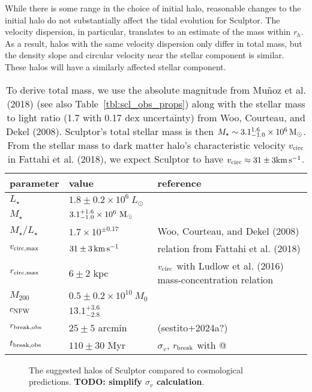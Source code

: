 While there is some range in the choice of initial halo, reasonable
changes to the initial halo do not substantially affect the tidal
evolution for Sculptor. The velocity dispersion, in particular,
translates to an estimate of the mass within \(r_h\). As a result, halos
with the same velocity dispersion only differ in total mass, but the
density slope and circular velocity near the stellar component is
similar. These halos will have a similarly affected stellar component.

\begin{table*}[t]
\centering
\caption[Derived Properties of Sculptor]{To derive total mass, we use the absolute magnitude from Muñoz et al. (2018) (see also Table \ref{tbl:scl_obs_props}) along with the stellar mass to light ratio (1.7 with 0.17 dex uncertainty) from Woo, Courteau, and Dekel (2008). Sculptor’s total stellar mass is then $M_\star \sim 3.1_{-1.0}^{1.6} \times 10^6\,{\rm M}_{\odot}$. From the stellar mass to dark matter halo’s characteristic velocity $v_{\rm circ}$ in Fattahi et al. (2018), we expect Sculptor to have $v_{\rm circ} \approx 31 \pm 3 {\rm km\,s^{-1}}$. }
\label{tbl:scl_derived_props}
\begin{tabular}{lll}
\toprule
parameter & value & reference\\
\midrule
$L_\star$ & $1.8\pm0.2\times10^6\ L_\odot$ & \\
$M_\star$ & $3.1_{-1.0}^{+1.6} \times10^6\ {\rm M}_\odot$ & \\
$M_\star / L_\star$ & $1.7\times 10^{\pm 0.17}$ & Woo, Courteau, and Dekel (2008)\\
$v_{\rm circ, max}$ & $31\pm 3\,{\rm km\,s^{-1}}$ & relation from Fattahi et al. (2018)\\
$r_{\rm circ, max}$ & $6 \pm 2$ kpc & $v_{\rm circ}$ with Ludlow et al. (2016) mass-concentration relation\\
$M_{200}$ & $0.5 \pm 0.2\times10^{10}\ M_0$ & \\
$c_{\rm NFW}$ & $13.1_{-2.8}^{+3.6}$ & \\
$r_{\rm break, obs}$ & $25 \pm 5$ arcmin & (sestito+2024a?)\\
$t_{\rm break, obs}$ & $110\pm30$ Myr & $\sigma_v$, $r_{\rm break}$ with @\\
\bottomrule
\end{tabular}
\end{table*}

\begin{figure}
\centering
{}
\caption[Sculptor initial halos]{The suggested halos of Sculptor
compared to cosmological predictions. \textbf{TODO: simplify
\(\sigma_v\) calculation}.}\label{fig:scl_halos}
\end{figure}

